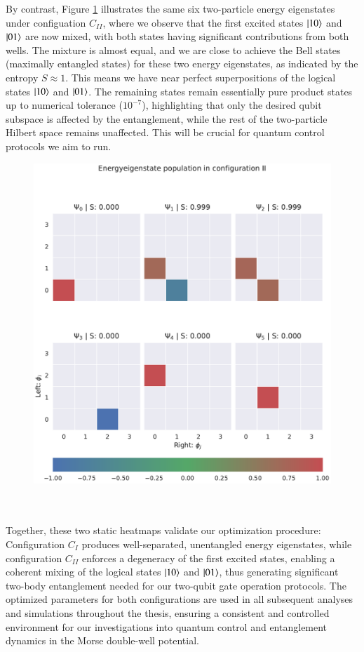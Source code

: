 \documentclass{subfiles}
\begin{document}
By contrast, Figure \ref{fig:state_populations_II} illustrates the same six two-particle energy eigenstates under configuation $C_{II}$, where we observe that the first excited states $\ket{10}$ and $\ket{01}$ are now mixed, with both states having significant contributions from both wells. The mixture is almost equal, and we are close to achieve the Bell states (maximally entangled states) for these two energy eigenstates, as indicated by the entropy $S \approx 1$. This means we have near perfect superpositions of the logical states $\ket{10}$ and $\ket{01}$. The remaining states remain essentially pure product states up to numerical tolerance ($10^{-7}$), highlighting that only the desired qubit subspace is affected by the entanglement, while the rest of the two-particle Hilbert space remains unaffected. This will be crucial for quantum control protocols we aim to run.

\begin{figure}[h!]
    \centering
    \includegraphics[width=1.0\textwidth]{figs/state_populations_II.pdf}
    \label{fig:state_populations_II}
\end{figure}
\\ \\

Together, these two static heatmaps validate our optimization procedure: Configuration $C_I$ produces well-separated, unentangled energy eigenstates, while configuration $C_{II}$ enforces a degeneracy of the first excited states, enabling a coherent mixing of the logical states $\ket{10}$ and $\ket{01}$, thus generating significant two-body entanglement needed for our two-qubit gate operation protocols. The optimized parameters for both configurations are used in all subsequent analyses and simulations throughout the thesis, ensuring a consistent and controlled environment for our investigations into quantum control and entanglement dynamics in the Morse double-well potential.
\end{document}
